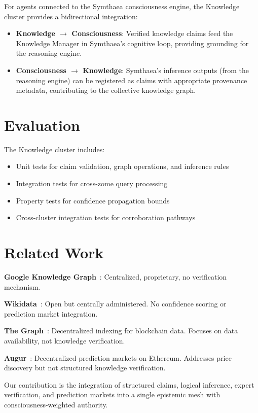 \documentclass[11pt,twocolumn]{article}
\begin{document}
For agents connected to the Symthaea consciousness engine, the Knowledge
cluster provides a bidirectional integration:

\begin{itemize}[nosep]
  \item \textbf{Knowledge $\to$ Consciousness}: Verified knowledge claims
    feed the Knowledge Manager in Symthaea's cognitive loop, providing
    grounding for the reasoning engine.
  \item \textbf{Consciousness $\to$ Knowledge}: Symthaea's inference outputs
    (from the reasoning engine) can be registered as claims with appropriate
    provenance metadata, contributing to the collective knowledge graph.
\end{itemize}

\section{Evaluation}

The Knowledge cluster includes:
\begin{itemize}[nosep]
  \item Unit tests for claim validation, graph operations, and inference rules
  \item Integration tests for cross-zome query processing
  \item Property tests for confidence propagation bounds
  \item Cross-cluster integration tests for corroboration pathways
\end{itemize}

\section{Related Work}

\textbf{Google Knowledge Graph}~\cite{singhal2012}: Centralized, proprietary,
no verification mechanism.

\textbf{Wikidata}~\cite{vrandecic2014}: Open but centrally administered.
No confidence scoring or prediction market integration.

\textbf{The Graph}~\cite{thegraph2020}: Decentralized indexing for blockchain
data. Focuses on data availability, not knowledge verification.

\textbf{Augur}~\cite{peterson2015}: Decentralized prediction markets on
Ethereum. Addresses price discovery but not structured knowledge verification.

Our contribution is the integration of structured claims, logical inference,
expert verification, and prediction markets into a single epistemic mesh
with consciousness-weighted authority.
\end{document}
